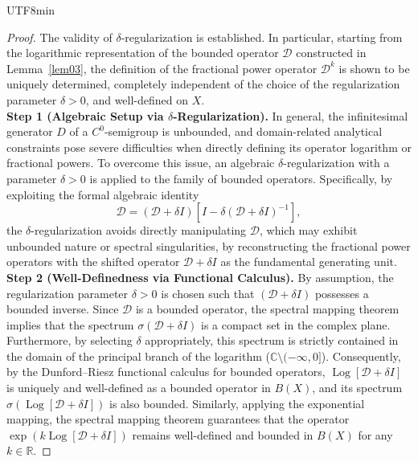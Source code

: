 \documentclass[10pt,a4paper]{article}
\theoremstyle{definition}
\theoremstyle{remark}
\begin{document}
\begin{CJK}{UTF8}{min}
\begin{proof}
The validity of $\delta$-regularization is established.
In particular, starting from the logarithmic representation of the bounded operator $\mathcal{D}$ constructed in Lemma~\ref{lem03}, the definition of the fractional power operator $\mathcal{D}^k$ is shown to be uniquely determined, completely independent of the choice of the regularization parameter $\delta > 0$, and well-defined on $X$.\vspace{2mm}\\
\noindent\textbf{Step 1 (Algebraic Setup via $\delta$-Regularization).}
In general, the infinitesimal generator $D$ of a $C^0$-semigroup is unbounded, and domain-related analytical constraints pose severe difficulties when directly defining its operator logarithm or fractional powers.
To overcome this issue, an algebraic $\delta$-regularization with a parameter $\delta > 0$ is applied to the family of bounded operators. 
Specifically, by exploiting the formal algebraic identity
\begin{equation} \label{algebraic-decomp}
\mathcal{D} = (\mathcal{D} + \delta I) \left[ I - \delta (\mathcal{D} + \delta I)^{-1} \right],
\end{equation}
the $\delta$-regularization avoids directly manipulating $\mathcal{D}$, which may exhibit unbounded nature or spectral singularities, by reconstructing the fractional power operators with the shifted operator $\mathcal{D} + \delta I$ as the fundamental generating unit.\vspace{2mm}\\
\noindent\textbf{Step 2 (Well-Definedness via Functional Calculus).} 
By assumption, the regularization parameter $\delta > 0$ is chosen such that $(\mathcal{D} + \delta I)$ possesses a bounded inverse. 
Since $\mathcal{D}$ is a bounded operator, the spectral mapping theorem implies that the spectrum $\sigma(\mathcal{D} + \delta I)$ is a compact set in the complex plane. 
Furthermore, by selecting $\delta$ appropriately, this spectrum is strictly contained in the domain of the principal branch of the logarithm ($\mathbb{C} \setminus (-\infty, 0]$). 
Consequently, by the Dunford--Riesz functional calculus for bounded operators, $\operatorname{Log} [\mathcal{D} + \delta I]$ is uniquely and well-defined as a bounded operator in $B(X)$, and its spectrum $\sigma(\operatorname{Log}[\mathcal{D} + \delta I])$ is also bounded. 
Similarly, applying the exponential mapping, the spectral mapping theorem guarantees that the operator $\exp(k \operatorname{Log} [\mathcal{D} + \delta I])$ remains well-defined and bounded in $B(X)$ for any $k \in \mathbb{R}$.

\end{proof}
\end{CJK}
\end{document}
